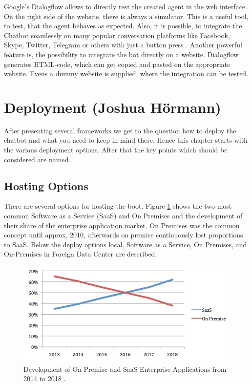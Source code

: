 \documentclass[10pt,final,journal,a4paper,oneside,twocolumn]{IEEEtran}
\begin{document}
Google's Dialogflow allows to directly test the created agent in the web interface. On the right side of the website, there is always a simulator. This is a useful tool, to test, that the agent behaves as expected. Also, it is possible, to integrate the Chatbot seamlessly on many popular conversation platforms like Facebook, Skype, Twitter, Telegram or others with just a button press \cite{b24}. Another powerful feature is, the possibility to integrate the bot directly on a website. Dialogflow generates HTML-code, which can get copied and pasted on the appropriate website. Evens a dummy website is supplied, where the integration can be tested.

\section{Deployment (Joshua Hörmann)}\label{sec:deployment}
After presenting several frameworks we get to the question how to deploy the chatbot and what you need to keep in mind there. 
Hence this chapter starts with the various deployment options. After that the key points which should be considered are named. 

\subsection{Hosting Options}
There are several options for hosting the boot. Figure \ref{SaaSvsOP} shows the two most common Software as a Service (SaaS) and On Premises and the development of their share of the enterprise application market. On Premises was the common concept until approx. 2010\cite{b26}, afterwards on premise continuously lost proportions to SaaS. Below the deploy options local, Software as a Service, On Premises, and On-Premises in Foreign Data Center are described.

\begin{figure}[htbp]
	\centerline{\includegraphics[width=1\linewidth]{pictures/SaaS-vsOn-premise.png}}
	\caption{Development of On Premise and SaaS Enterprise Applications from 2014 to 2018 \cite{b27}.}
	\label{SaaSvsOP}
\end{figure}
\end{document}
